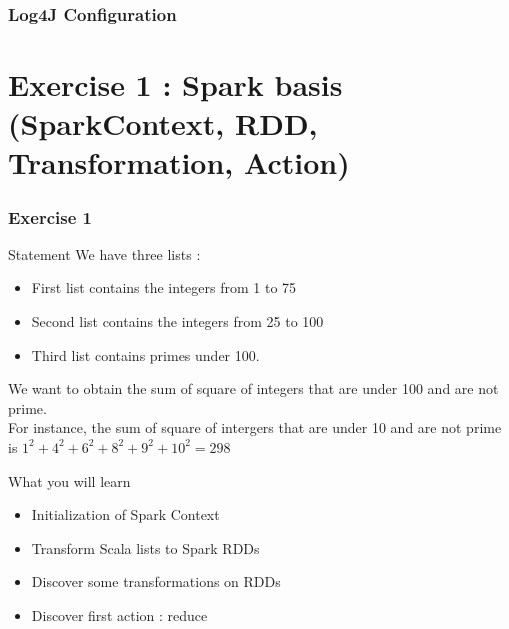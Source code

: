 \documentclass[slidetop,9pt,utf8]{beamer}
\begin{document}
\begin{CJK}{UTF8}{gbsn}
\begin{frame}
\end{frame}

\begin{frame}
  \frametitle{Log4J Configuration}

  

\end{frame}

%
%
%
%

\section{Exercise 1 : Spark basis (SparkContext, RDD, Transformation, Action)}


\begin{frame}
  \frametitle{Exercise 1}

  \begin{block}{Statement}
    We have three lists : 
    \begin{itemize}
      \item First list contains the integers from 1 to 75
      \item Second list contains the integers from 25 to 100
      \item Third list contains primes under 100. 
    \end{itemize}
    We want to obtain the sum of square of integers that are under 100 and are not prime.
    \\ \medskip
    For instance, the sum of square of intergers that are under 10 and are not prime is
    $1^{2} + 4^{2} + 6^{2} + 8^{2} + 9^{2} + 10^{2} = 298$
  \end{block}

  \begin{block}{What you will learn}
    \begin{itemize}
      \item Initialization of Spark Context
      \item Transform Scala lists to Spark RDDs
      \item Discover some transformations on RDDs
      \item Discover first action : reduce
    \end{itemize}
  \end{block}

\end{frame}


\end{CJK}
\end{document}
